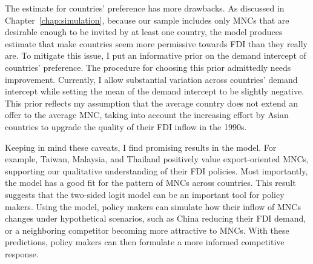 The estimate for countries' preference has more drawbacks. As discussed in
Chapter~\ref{chap:simulation}, because our sample includes only MNCs that are
desirable enough to be invited by at least one country, the model produces
estimate that make countries seem more permissive towards FDI than they really
are. To mitigate this issue, I put an informative prior on the demand intercept
of countries' preference. The procedure for choosing this prior admittedly needs
improvement. Currently, I allow substantial variation across countries' demand
intercept while setting the mean of the demand intercept to be slightly
negative. This prior reflects my assumption that the average country does not
extend an offer to the average MNC, taking into account the increasing effort by
Asian countries to upgrade the quality of their FDI inflow in the 1990s.

Keeping in mind these caveats, I find promising results in the model. For
example, Taiwan, Malaysia, and Thailand positively value export-oriented MNCs,
supporting our qualitative understanding of their FDI policies. Most
importantly, the model has a good fit for the pattern of MNCs across countries.
This result suggests that the two-sided logit model can be an important tool for
policy makers. Using the model, policy makers can simulate how their inflow of
MNCs changes under hypothetical scenarios, such as China reducing their FDI
demand, or a neighboring competitor becoming more attractive to MNCs. With these
predictions, policy makers can then formulate a more informed competitive
response.

